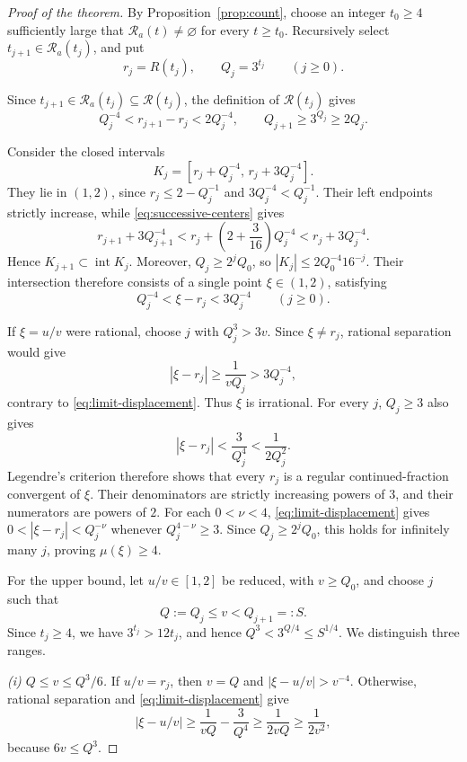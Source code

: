 \documentclass[11pt,reqno]{amsart}
\theoremstyle{definition}
\theoremstyle{plain}
\theoremstyle{definition}
\theoremstyle{remark}
\newcommand{\RR}{\mathcal R}
\begin{document}
\begin{proof}[Proof of the theorem]
By Proposition~\ref{prop:count}, choose an integer
$t_0\ge4$ sufficiently large that $\RR_a(t)\ne\varnothing$
for every $t\ge t_0$. Recursively select
$t_{j+1}\in\RR_a(t_j)$, and put
\[
 r_j=R(t_j),\qquad Q_j=3^{t_j}\qquad(j\ge0).
\]

Since $t_{j+1}\in\RR_a(t_j)\subseteq\RR(t_j)$,
the definition of $\RR(t_j)$ gives
\begin{equation}\label{eq:successive-centers}
 Q_j^{-4}<r_{j+1}-r_j<2Q_j^{-4},
 \qquad Q_{j+1}\ge3^{Q_j}\ge2Q_j.
\end{equation}

Consider the closed intervals
\[
 K_j=[r_j+Q_j^{-4},\,r_j+3Q_j^{-4}].
\]
They lie in $(1,2)$, since $r_j\le2-Q_j^{-1}$ and
$3Q_j^{-4}<Q_j^{-1}$. Their left endpoints strictly
increase, while \eqref{eq:successive-centers} gives
\[
 r_{j+1}+3Q_{j+1}^{-4}
 <r_j+\left(2+\frac3{16}\right)Q_j^{-4}
 <r_j+3Q_j^{-4}.
\]
Hence $K_{j+1}\subset\operatorname{int}K_j$.
Moreover, $Q_j\ge2^jQ_0$, so
$|K_j|\le2Q_0^{-4}16^{-j}$. Their intersection
therefore consists of a single point $\xi\in(1,2)$,
satisfying
\begin{equation}\label{eq:limit-displacement}
 Q_j^{-4}<\xi-r_j<3Q_j^{-4}\qquad(j\ge0).
\end{equation}

If $\xi=u/v$ were rational, choose $j$ with
$Q_j^3>3v$. Since $\xi\ne r_j$, rational separation
would give
\[
 |\xi-r_j|\ge\frac1{vQ_j}>3Q_j^{-4},
\]
contrary to \eqref{eq:limit-displacement}.
Thus $\xi$ is irrational. For every $j$, $Q_j\ge3$
also gives
\[
 |\xi-r_j|<\frac3{Q_j^4}<\frac1{2Q_j^2}.
\]
Legendre's criterion
\cite[Theorem~1.8, p.~10]{Bugeaud}
therefore shows that every $r_j$ is a regular
continued-fraction convergent of $\xi$.
Their denominators are strictly increasing powers of $3$,
and their numerators are powers of $2$.
For each $0<\nu<4$, \eqref{eq:limit-displacement}
gives $0<|\xi-r_j|<Q_j^{-\nu}$ whenever
$Q_j^{4-\nu}\ge3$. Since $Q_j\ge2^jQ_0$, this holds
for infinitely many $j$, proving $\mu(\xi)\ge4$.

For the upper bound, let $u/v\in[1,2]$ be reduced,
with $v\ge Q_0$, and choose $j$ such that
\[
 Q:=Q_j\le v<Q_{j+1}=:S.
\]
Since $t_j\ge4$, we have $3^{t_j}>12t_j$, and hence
$Q^3<3^{Q/4}\le S^{1/4}$. We distinguish three ranges.

\smallskip
\noindent\emph{(i) $Q\le v\le Q^3/6$.}
If $u/v=r_j$, then $v=Q$ and
$|\xi-u/v|>v^{-4}$. Otherwise, rational separation
and \eqref{eq:limit-displacement} give
\[
 |\xi-u/v|
 \ge\frac1{vQ}-\frac3{Q^4}
 \ge\frac1{2vQ}\ge\frac1{2v^2},
\]
because $6v\le Q^3$.


\end{proof}
\end{document}
